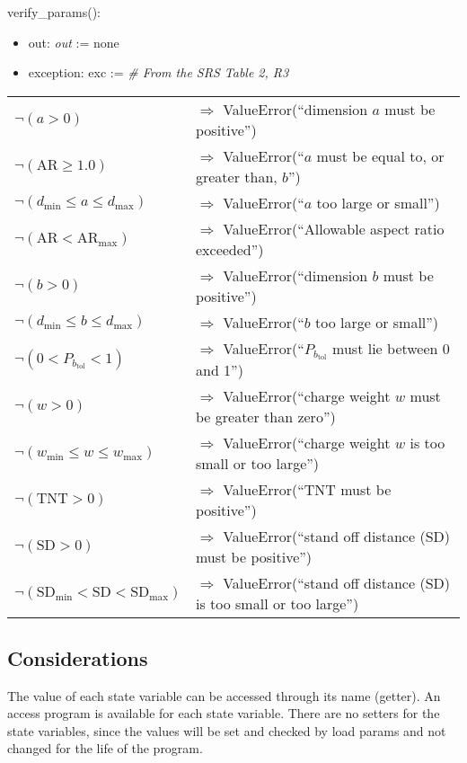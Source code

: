 \documentclass[12pt, titlepage]{article}
\begin{document}
\noindent verify\_params():
\begin{itemize}
\item out: \textit{out} := none
\item exception: exc := \textit{\# From the SRS Table 2, R3}
\end{itemize}
\noindent \begin{longtable*}[l]{l l}
  $\neg (a > 0)$ & $\Rightarrow$ ValueError(``dimension $a$ must be positive'')\\
  $\neg (\text{AR} \geq 1.0)$ & $\Rightarrow$ ValueError(``$a$ must be equal to, or
  greater than, $b$'')\\
  $\neg (d_{\text{min}} \leq a \leq d_{\text{max}})$ & $\Rightarrow$
  ValueError(``$a$ too
  large or small'')\\
  $\neg(\text{AR}< \text{AR}_{\text{max}})$ & $\Rightarrow$ ValueError(``Allowable
  aspect
  ratio exceeded'')\\
  $\neg (b > 0)$ & $\Rightarrow$ ValueError(``dimension $b$ must be positive'')\\
  $\neg(d_{\text{min}} \leq b \leq d_{\text{max}})$ & $\Rightarrow$
  ValueError(``$b$ too
  large or small'')\\
  $\neg(0 < P_{b_{\text{tol}}} < 1)$ & $\Rightarrow$
  ValueError(``$P_{b_{\text{tol}}}$
  must lie between 0 and 1'')\\
  $\neg (w > 0)$ & $\Rightarrow$ ValueError(``charge weight $w$ must be
  greater than zero'')\\
  $\neg (w_{\text{min}} \leq w \leq w_{\text{max}})$ & $\Rightarrow$ ValueError(``charge
  weight $w$ is too small or too large'')\\
  $\neg (\mbox{TNT} > 0)$ & $\Rightarrow$ ValueError(``TNT must be positive'')\\
  $\neg (\mbox{SD} > 0)$ & $\Rightarrow$ ValueError(``stand off distance (SD)
  must be positive'')\\
  $\neg (\text{SD}_{\text{min}}<\text{SD}<\text{SD}_{\text{max}})$ &
  $\Rightarrow$ ValueError(``stand off distance (SD) is too small or too large'')\\

\end{longtable*}

\subsection{Considerations}

The value of each state variable can be accessed through its name (getter).  An
access program is available for each state variable.  There are no setters for
the state variables, since the values will be set and checked by load params and
not changed for the life of the program.
\end{document}
